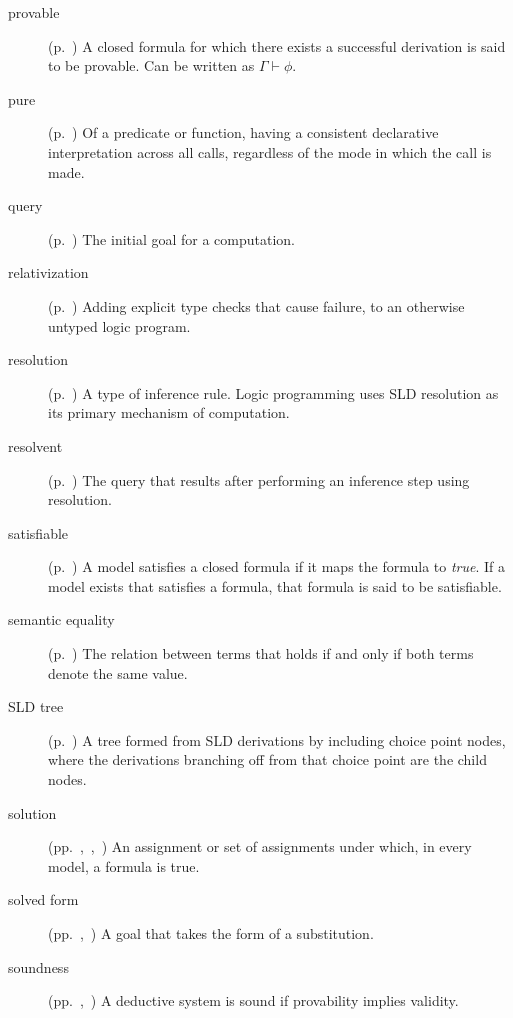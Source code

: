 \begin{description}
\item[provable]
(p.~\pageref{gi:provable})
A closed formula for which there exists a successful derivation
is said to be provable.
Can be written as $\Gamma \vdash \phi$.

\item[pure]
(p.~\pageref{gi:pure})
Of a predicate or function,
having a consistent declarative interpretation across all calls,
regardless of the mode in which the call is made.

\item[query]
(p.~\pageref{sec:queries})
The initial goal for a computation.

\item[relativization]
(p.~\pageref{gi:relativization})
Adding explicit type checks that cause failure,
to an otherwise untyped logic program.

\item[resolution]
(p.~\pageref{gi:resolution})
A type of inference rule.
Logic programming uses SLD resolution
as its primary mechanism of computation.

\item[resolvent]
(p.~\pageref{gi:resolvent})
The query that results after performing an inference step
using resolution.

\item[satisfiable]
(p.~\pageref{gi:satisfiable})
A model satisfies a closed formula if it maps the formula to \textit{true}.
If a model exists that satisfies a formula,
that formula is said to be satisfiable.

\item[semantic equality]
(p.~\pageref{gi:semantic-equality})
The relation between terms that holds
if and only if both terms denote the same value.

\item[SLD tree]
(p.~\pageref{gi:sld-tree})
A tree formed from SLD derivations by including choice point nodes,
where the derivations branching off from that choice point
are the child nodes.

\item[solution]
(pp.~\pageref{gi:solution},~\pageref{gi:solution2},~\pageref{gi:solution3})
An assignment or set of assignments under which, in every model,
a formula is true.

\item[solved form]
(pp.~\pageref{gi:solved-form},~\pageref{gi:solved-form2})
A goal that takes the form of a substitution.

\item[soundness]
(pp.~\pageref{thm:soundness},~\pageref{gi:soundness2})
A deductive system is sound if provability implies validity.


\end{description}
